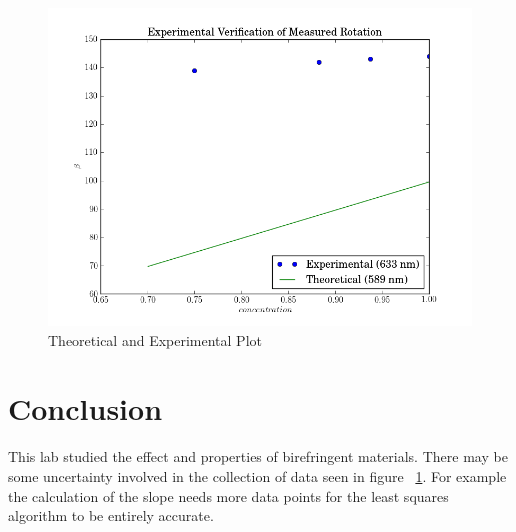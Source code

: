 \documentclass[paper=a4, fontsize=11pt]{scrartcl} %
\numberwithin{equation}{section}
\numberwithin{figure}{section}
\numberwithin{table}{section}
\begin{document}
\begin{figure}[H]
\centering
\includegraphics[scale =0.4]{fig}
\caption{Theoretical and Experimental Plot}
\label{fig:figure}
\end{figure}

\section{Conclusion}
This lab studied the effect and properties of birefringent materials. There may be some uncertainty involved in the collection of data seen in figure ~\ref{fig:figure}. For example the calculation of the slope needs more data points for the least squares algorithm to be entirely accurate.
\end{document}
